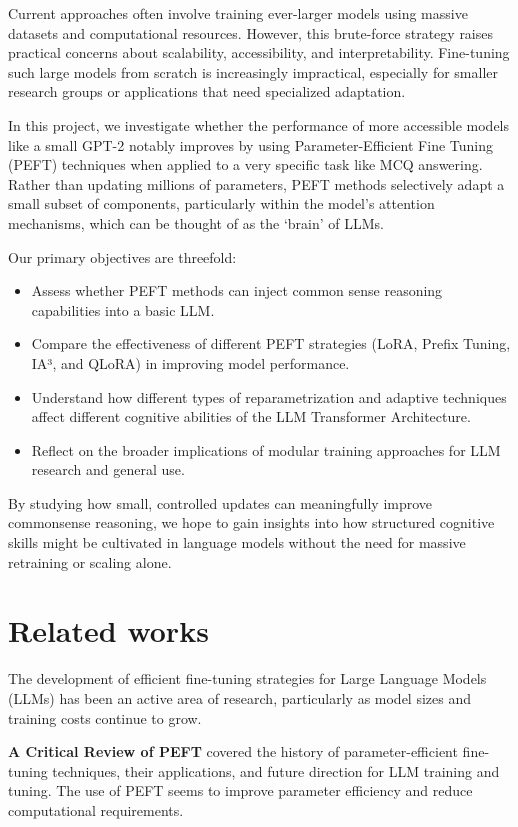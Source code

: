 \documentclass[11pt,twocolumn]{article}
\begin{document}
Current approaches often involve training ever-larger models using massive datasets and computational resources. However, this brute-force strategy raises practical concerns about scalability, accessibility, and interpretability. Fine-tuning such large models from scratch is increasingly impractical, especially for smaller research groups or applications that need specialized adaptation.

In this project, we investigate whether the performance of more accessible models like a small GPT-2 notably improves by using Parameter-Efficient Fine Tuning (PEFT) techniques when applied to a very specific task like MCQ answering. Rather than updating millions of parameters, PEFT methods selectively adapt a small subset of components, particularly within the model's attention mechanisms, which can be thought of as the `brain' of LLMs.

Our primary objectives are threefold:
\begin{itemize}
    \item Assess whether PEFT methods can inject common sense reasoning capabilities into a basic LLM.
    \item Compare the effectiveness of different PEFT strategies (LoRA, Prefix Tuning, IA³, and QLoRA) in improving model performance.
    \item Understand how different types of reparametrization and adaptive techniques affect different cognitive abilities of the LLM Transformer Architecture.
    \item Reflect on the broader implications of modular training approaches for LLM research and general use.
\end{itemize}

By studying how small, controlled updates can meaningfully improve commonsense reasoning, we hope to gain insights into how structured cognitive skills might be cultivated in language models without the need for massive retraining or scaling alone.



\section{Related works}
\label{sec:background}

The development of efficient fine-tuning strategies for Large Language Models (LLMs) has been an active area of research, particularly as model sizes and training costs continue to grow.

\textbf{A Critical Review of PEFT} \cite{Xu2023} covered the history of parameter-efficient fine-tuning techniques, their applications, and future direction for LLM training and tuning. The use of PEFT seems to improve parameter efficiency and reduce computational requirements.
\end{document}
